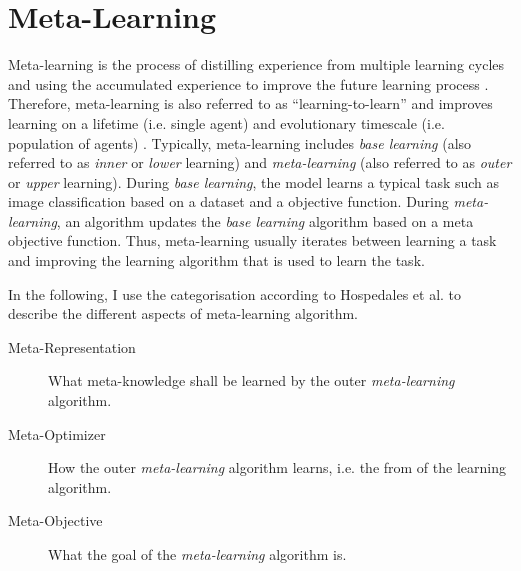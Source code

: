\section{Meta-Learning}
Meta-learning is the process of distilling experience from multiple learning cycles and using the accumulated experience to improve the future learning process .
Therefore, meta-learning is also referred to as ``learning-to-learn''  and improves learning on a lifetime (i.e. single agent) and evolutionary timescale (i.e. population of agents) .
Typically, meta-learning includes \emph{base learning} (also referred to as \emph{inner} or \emph{lower} learning) and \emph{meta-learning} (also referred to as \emph{outer} or \emph{upper} learning).
During \emph{base learning}, the model learns a typical task such as image classification based on a dataset and a objective function.
During \emph{meta-learning}, an algorithm updates the \emph{base learning} algorithm based on a meta objective function.
Thus, meta-learning usually iterates between learning a task and improving the learning algorithm that is used to learn the task.

In the following, I use the categorisation according to Hospedales et al. \cite{Hospedales_Antoniou_Micaelli_Storkey_2021} to describe the different aspects of meta-learning algorithm.
\begin{description}
   \item[Meta-Representation] What meta-knowledge shall be learned by the outer \emph{meta-learning} algorithm.
   \item[Meta-Optimizer] How the outer \emph{meta-learning} algorithm learns, i.e. the from of the learning algorithm.
   \item[Meta-Objective] What the goal of the \emph{meta-learning} algorithm is.
\end{description}

